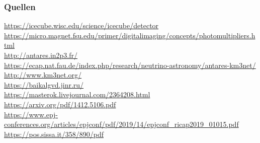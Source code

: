 \documentclass[aspectratio=1610, 9pt]{beamer}
\begin{document}
\begin{frame}\frametitle{Quellen}
\url{https://icecube.wisc.edu/science/icecube/detector} \\
\url{https://micro.magnet.fsu.edu/primer/digitalimaging/concepts/photomultipliers.html} \\
\url{http://antares.in2p3.fr/} \\
\url{https://ecap.nat.fau.de/index.php/research/neutrino-astronomy/antares-km3net/} \\
\url{http://www.km3net.org/} \\
\url{https://baikalgvd.jinr.ru/} \\
\url{https://masterok.livejournal.com/2364208.html} \\
\url{https://arxiv.org/pdf/1412.5106.pdf} \\
\url{https://www.epj-conferences.org/articles/epjconf/pdf/2019/14/epjconf_ricap2019_01015.pdf} \\
\url{https://pos.sissa.it/358/890/pdf} \\

\end{frame}
\end{document}
